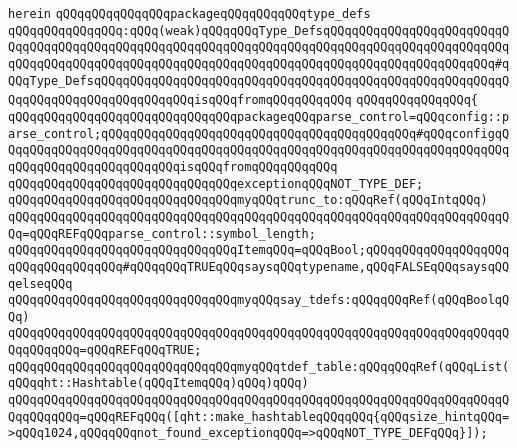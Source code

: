 \verb|herein|\newline
\newline
\verb|qQQqqQQqqQQqqQQqpackageqQQqqQQqqQQqtype_defs|\newline
\verb|qQQqqQQqqQQqqQQq:qQQq(weak)qQQqqQQqType_DefsqQQqqQQqqQQqqQQqqQQqqQQqqQQqqQQqqQQqqQQqqQQqqQQqqQQqqQQqqQQqqQQqqQQqqQQqqQQqqQQqqQQqqQQqqQQqqQQqqQQqqQQqqQQqqQQqqQQqqQQqqQQqqQQqqQQqqQQqqQQqqQQqqQQqqQQqqQQqqQQqqQQq#qQQqType_DefsqQQqqQQqqQQqqQQqqQQqqQQqqQQqqQQqqQQqqQQqqQQqqQQqqQQqqQQqqQQqqQQqqQQqqQQqqQQqqQQqqQQqisqQQqfromqQQqqQQqqQQq|\newline
\verb|qQQqqQQqqQQqqQQq{|\newline
\verb|qQQqqQQqqQQqqQQqqQQqqQQqqQQqqQQqpackageqQQqparse_control=qQQqconfig::parse_control;qQQqqQQqqQQqqQQqqQQqqQQqqQQqqQQqqQQqqQQqqQQq#qQQqconfigqQQqqQQqqQQqqQQqqQQqqQQqqQQqqQQqqQQqqQQqqQQqqQQqqQQqqQQqqQQqqQQqqQQqqQQqqQQqqQQqqQQqqQQqqQQqqQQqisqQQqfromqQQqqQQqqQQq|\newline
\newline
\verb|qQQqqQQqqQQqqQQqqQQqqQQqqQQqqQQqexceptionqQQqNOT_TYPE_DEF;|\newline
\newline
\verb|qQQqqQQqqQQqqQQqqQQqqQQqqQQqqQQqmyqQQqtrunc_to:qQQqRef(qQQqIntqQQq)|\newline
\verb|qQQqqQQqqQQqqQQqqQQqqQQqqQQqqQQqqQQqqQQqqQQqqQQqqQQqqQQqqQQqqQQqqQQqqQQq=qQQqREFqQQqparse_control::symbol_length;|\newline
\newline
\verb|qQQqqQQqqQQqqQQqqQQqqQQqqQQqqQQqItemqQQq=qQQqBool;qQQqqQQqqQQqqQQqqQQqqQQqqQQqqQQqqQQq#qQQqqQQqTRUEqQQqsaysqQQqtypename,qQQqFALSEqQQqsaysqQQqelseqQQq|\newline
\newline
\verb|qQQqqQQqqQQqqQQqqQQqqQQqqQQqqQQqmyqQQqsay_tdefs:qQQqqQQqRef(qQQqBoolqQQq)|\newline
\verb|qQQqqQQqqQQqqQQqqQQqqQQqqQQqqQQqqQQqqQQqqQQqqQQqqQQqqQQqqQQqqQQqqQQqqQQqqQQqqQQq=qQQqREFqQQqTRUE;|\newline
\newline
\verb|qQQqqQQqqQQqqQQqqQQqqQQqqQQqqQQqmyqQQqtdef_table:qQQqqQQqRef(qQQqList(qQQqqht::Hashtable(qQQqItemqQQq)qQQq)qQQq)|\newline
\verb|qQQqqQQqqQQqqQQqqQQqqQQqqQQqqQQqqQQqqQQqqQQqqQQqqQQqqQQqqQQqqQQqqQQqqQQqqQQqqQQq=qQQqREFqQQq([qht::make_hashtableqQQqqQQq{qQQqsize_hintqQQq=>qQQq1024,qQQqqQQqnot_found_exceptionqQQq=>qQQqNOT_TYPE_DEFqQQq}]);|\newline

